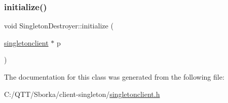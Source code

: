 \subsubsection{\texorpdfstring{initialize()}{initialize()}}
{\footnotesize\ttfamily void Singleton\+Destroyer\+::initialize (\begin{DoxyParamCaption}\item[{\mbox{\hyperlink{classsingletonclient}{singletonclient}} $\ast$}]{p }\end{DoxyParamCaption})\hspace{0.3cm}{\ttfamily [inline]}}



The documentation for this class was generated from the following file\+:\begin{DoxyCompactItemize}
\item 
C\+:/\+Q\+T\+T/\+Sborka/client-\/singleton/\mbox{\hyperlink{singletonclient_8h}{singletonclient.\+h}}\end{DoxyCompactItemize}
